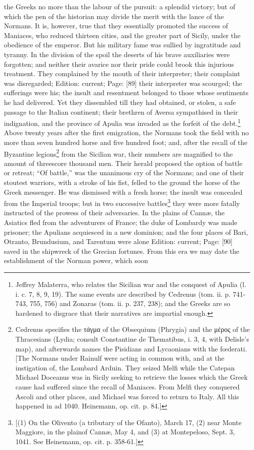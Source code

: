 the Greeks no more than the labour of the pursuit: a splendid victory; but of which the pen of the historian may divide the merit with the lance of the Normans. It is, however, true that they essentially promoted the success of Maniaces, who reduced thirteen cities, and the greater part of Sicily, under the obedience of the emperor. But his military fame was sullied by ingratitude and tyranny. In the division of the spoil the deserts of his brave auxiliaries were forgotten; and neither their avarice nor their pride could brook this injurious treatment. They complained by the mouth of their interpreter; their complaint was disregarded; Edition: current; Page: [89] their interpreter was scourged; the sufferings were his; the insult and resentment belonged to those whose sentiments he had delivered. Yet they dissembled till they had obtained, or stolen, a safe passage to the Italian continent; their brethren of Aversa sympathised in their indignation, and the province of Apulia was invaded as the forfeit of the debt.\footnote{Jeffrey Malaterra, who relates the Sicilian war and the conquest of Apulia (l. i. c. 7, 8, 9, 19). The same events are described by Cedrenus (tom. ii. p. 741-743, 755, 756) and Zonaras (tom. ii. p. 237, 238); and the Greeks are so hardened to disgrace that their narratives are impartial enough.} Above twenty years after the first emigration, the Normans took the field with no more than seven hundred horse and five hundred foot; and, after the recall of the Byzantine legions\footnote{Cedrenus specifies the \textgreek{τάγμα} of the Obsequium (Phrygia) and the \textgreek{μέρος} of the Thracesians (Lydia; consult Constantine de Thematibus, i. 3, 4, with Delisle\texthebrew{}’s map), and afterwards names the Pisidians and Lycaonians with the fœderati. [The Normans under Rainulf were acting in common with, and at the instigation of, the Lombard Arduin. They seized Melfi while the Catepan Michael Doceanus was in Sicily seeking to retrieve the losses which the Greek cause had suffered since the recall of Maniaces. From Melfi they conquered Ascoli and other places, and Michael was forced to return to Italy. All this happened in ad 1040. Heinemann, op. cit. p. 84.]} from the Sicilian war, their numbers are magnified to the amount of threescore thousand men. Their herald proposed the option of battle or retreat; \texthebrew{“}Of battle,\texthebrew{}” was the unanimous cry of the Normans; and one of their stoutest warriors, with a stroke of his fist, felled to the ground the horse of the Greek messenger. He was dismissed with a fresh horse; the insult was concealed from the Imperial troops; but in two successive battles\footnote{[(1) On the Olivento (a tributary of the Ofanto), March 17, (2) near Monte Maggiore, in the plainof Cannæ, May 4, and (3) at Montepeloso, Sept. 3, 1041. See Heinemann, op. cit. p. 358-61.]} they were more fatally instructed of the prowess of their adversaries. In the plains of Cannæ, the Asiatics fled from the adventurers of France; the duke of Lombardy was made prisoner; the Apulians acquiesced in a new dominion; and the four places of Bari, Otranto, Brundusium, and Tarentum were alone Edition: current; Page: [90] saved in the shipwreck of the Grecian fortunes. From this era we may date the establishment of the Norman power, which soon 